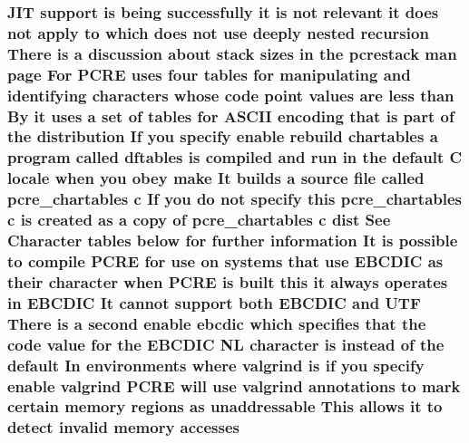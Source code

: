 \subsubsection[{\texorpdfstring{accesses}{accesses}}]{ J\+IT {\bf support} {\bf is} being successfully {\bf it} {\bf is} {\bf not} relevant {\bf it} does {\bf not} apply {\bf to} {\bf which} does {\bf not} use deeply nested {\bf recursion} There {\bf is} {\bf a} discussion about {\bf stack} sizes {\bf in} the pcrestack {\bf man} page For {\bf P\+C\+RE} uses four {\bf tables} for manipulating and identifying {\bf characters} whose {\bf code} {\bf point} {\bf values} {\bf are} less {\bf than} By {\bf it} uses {\bf a} {\bf set} {\bf of} {\bf tables} for {\bf A\+S\+C\+II} {\bf encoding} that {\bf is} part {\bf of} the distribution If you specify enable rebuild {\bf chartables} {\bf a} {\bf program} called {\bf dftables} {\bf is} {\bf compiled} and {\bf run} {\bf in} the {\bf default} {\bf C} {\bf locale} when you obey {\bf make} It builds {\bf a} {\bf source} {\bf file} called pcre\+\_\+chartables {\bf c} If you {\bf do} {\bf not} specify {\bf this} pcre\+\_\+chartables {\bf c} {\bf is} created {\bf as} {\bf a} copy {\bf of} pcre\+\_\+chartables {\bf c} {\bf dist} See Character {\bf tables} {\bf below} for further information It {\bf is} {\bf possible} {\bf to} {\bf compile} {\bf P\+C\+RE} for use {\bf on} {\bf systems} that use E\+B\+C\+D\+IC {\bf as} their {\bf character} when {\bf P\+C\+RE} {\bf is} {\bf built} {\bf this} {\bf it} always operates {\bf in} E\+B\+C\+D\+IC It cannot {\bf support} both E\+B\+C\+D\+IC and U\+TF There {\bf is} {\bf a} {\bf second} enable ebcdic {\bf which} specifies that the {\bf code} {\bf value} for the E\+B\+C\+D\+IC {\bf NL} {\bf character} {\bf is} instead {\bf of} the {\bf default} In {\bf environments} {\bf where} valgrind {\bf is} {\bf if} you specify enable valgrind {\bf P\+C\+RE} will use valgrind annotations {\bf to} {\bf mark} certain {\bf memory} regions {\bf as} unaddressable This allows {\bf it} {\bf to} detect invalid {\bf memory} accesses}\hypertarget{README_8txt_a3987680919ecdc5723aa2db27cfa0559}{}\label{README_8txt_a3987680919ecdc5723aa2db27cfa0559}

